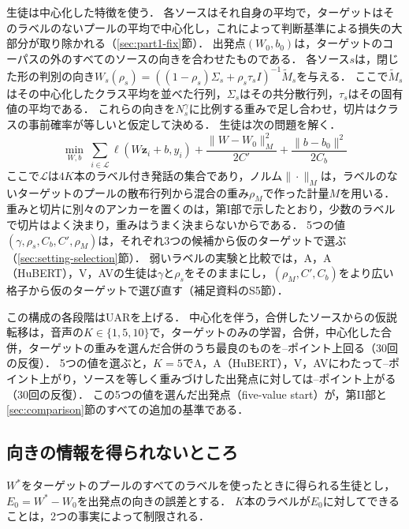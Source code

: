 生徒は中心化した特徴を使う．
各ソースはそれ自身の平均で，ターゲットはそのラベルのないプールの平均で中心化し，これによって判断基準による損失の大部分が取り除かれる（\ref{sec:part1-fix}節）．
出発点$(W_0, b_0)$は，ターゲットのコーパスの外のすべてのソースの向きを合わせたものである．
各ソース$s$は，閉じた形の判別の向き$W_s(\rho_s) = ((1-\rho_s)\Sigma_s + \rho_s \tau_s I)^{-1}\tilde{M}_s$を与える．
ここで$\tilde{M}_s$はその中心化したクラス平均を並べた行列，$\Sigma_s$はその共分散行列，$\tau_s$はその固有値の平均である．
これらの向きを$N_s^{\gamma}$に比例する重みで足し合わせ，切片はクラスの事前確率が等しいと仮定して決める．
生徒は次の問題を解く．
\begin{equation}
\label{eq:student}
\min_{W, b}\ \sum_{i \in \mathcal{L}} \ell\!\left(W \mathbf{z}_i + b, y_i\right) + \frac{\|W - W_0\|_{M}^2}{2C'} + \frac{\|b - b_0\|^2}{2C_b}
\end{equation}
ここで$\mathcal{L}$は$4K$本のラベル付き発話の集合であり，ノルム$\|\cdot\|_M$は，ラベルのないターゲットのプールの散布行列から混合の重み$\rho_M$で作った計量$M$を用いる．
重みと切片に別々のアンカーを置くのは，第I部で示したとおり，少数のラベルで切片はよく決まり，重みはうまく決まらないからである．
5つの値$(\gamma, \rho_s, C_b, C', \rho_M)$は，それぞれ3つの候補から仮のターゲットで選ぶ（\ref{sec:setting-selection}節）．
弱いラベルの実験と比較では，A，A（HuBERT），V，AVの生徒は$\gamma$と$\rho_s$をそのままにし，$(\rho_M, C', C_b)$をより広い格子から仮のターゲットで選び直す（補足資料のS5節）．

この構成の各段階はUARを上げる．
中心化を伴う，合併したソースからの仮説転移は，音声の$K \in \{1, 5, 10\}$で，ターゲットのみの学習，合併，中心化した合併，ターゲットの重みを選んだ合併のうち最良のものを--ポイント上回る（30回の反復）．
5つの値を選ぶと，$K=5$でA，A（HuBERT），V，AVにわたって--ポイント上がり，ソースを等しく重みづけした出発点に対しては--ポイント上がる（30回の反復）．
この5つの値を選んだ出発点（five-value start）が，第II部と\ref{sec:comparison}節のすべての追加の基準である．

\subsection{向きの情報を得られないところ}
\label{sec:part2-limits}

$W^{*}$をターゲットのプールのすべてのラベルを使ったときに得られる生徒とし，$E_0 = W^{*} - W_0$を出発点の向きの誤差とする．
$K$本のラベルが$E_0$に対してできることは，2つの事実によって制限される．

